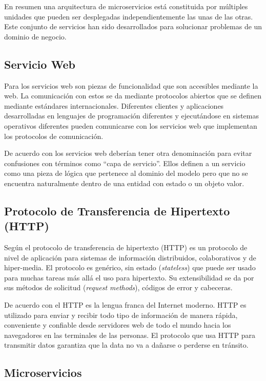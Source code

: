 En resumen una arquitectura de microservicios está constituida por múltiples unidades que pueden ser
desplegadas independientemente las unas de las otras. Este conjunto de servicios han sido desarrollados
para solucionar problemas de un dominio de negocio.


\subsection{Servicio Web}

Para \cite{bruijn2006web} los servicios web son piezas de funcionalidad que son accesibles mediante la web.
La comunicación con estos se da mediante protocolos abiertos que se definen mediante estándares internacionales.
Diferentes clientes y aplicaciones desarrolladas en lenguajes de programación diferentes y ejecutándose
en sistemas operativos diferentes pueden comunicarse con los servicios web que implementan
los protocolos de comunicación.

De acuerdo con \cite{percival2020architecture} los servicios web deberían tener otra denominación para evitar
confusiones con términos como ``capa de servicio''.
Ellos definen a un servicio como una pieza de lógica que pertenece al dominio del modelo pero que no se encuentra
naturalmente dentro de una entidad con estado o un objeto valor.


\subsection{Protocolo de Transferencia de Hipertexto (HTTP)}

Según \cite{goralski2017illustrated} el protocolo de transferencia de hipertexto (HTTP) es un protocolo de nivel de aplicación para sistemas de información
distribuidos, colaborativos y de hiper-media.
El protocolo es genérico, sin estado ({\it stateless}) que puede ser usado para muchas tareas más allá el uso para hipertexto.
Su extensibilidad se da por sus métodos de solicitud ({\it request methods}), códigos de error y cabeceras.

De acuerdo con \cite{gourley2002http} el HTTP es la lengua franca del Internet moderno.
HTTP es utilizado para enviar y recibir todo tipo de información de manera rápida, conveniente y confiable
desde servidores web de todo el mundo hacia los navegadores en las terminales de las personas.
El protocolo que usa HTTP para transmitir datos garantiza que la data no va a dañarse o perderse en
tránsito.


\subsection{Microservicios}

